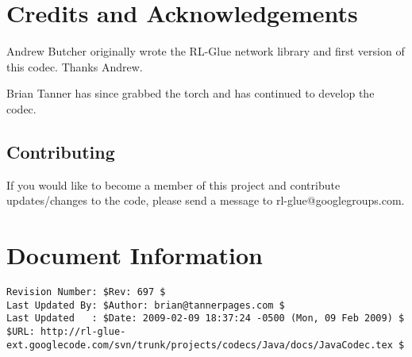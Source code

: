 \documentclass[11pt]{article}
\begin{document}
\section{Credits and Acknowledgements}
Andrew Butcher originally wrote the RL-Glue network library and first version of this codec.  Thanks Andrew.

Brian Tanner has since grabbed the torch and has continued to develop the codec.

\subsection{Contributing}
If you would like to become a member of this project and contribute updates/changes to the code, please send a message to rl-glue@googlegroups.com.


\section*{Document Information}
\begin{verbatim}
Revision Number: $Rev: 697 $
Last Updated By: $Author: brian@tannerpages.com $
Last Updated   : $Date: 2009-02-09 18:37:24 -0500 (Mon, 09 Feb 2009) $
$URL: http://rl-glue-ext.googlecode.com/svn/trunk/projects/codecs/Java/docs/JavaCodec.tex $
\end{verbatim}
\end{document}
